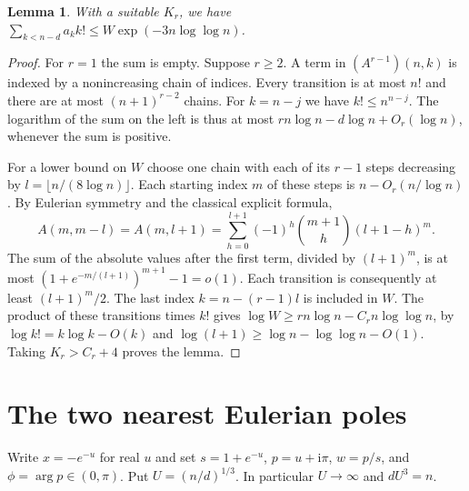 \documentclass[11pt]{article}
\newtheorem{lemma}[theorem]{Lemma}
\newcommand{\ii}{\mathrm{i}}
\begin{document}
\begin{lemma}\label{conc}
With a suitable $K_r$, we have $\sum_{k<n-d}a_k k!\le W\exp(-3n\log\log n)$.
\end{lemma}
\begin{proof}
For $r=1$ the sum is empty. Suppose $r\ge2$. A term in $(A^{r-1})(n,k)$ is indexed by a nonincreasing chain of indices. Every transition is at most $n!$ and there are at most $(n+1)^{r-2}$ chains. For $k=n-j$ we have $k!\le n^{n-j}$. The logarithm of the sum on the left is thus at most $rn\log n-d\log n+O_r(\log n)$, whenever the sum is positive.

For a lower bound on $W$ choose one chain with each of its $r-1$ steps decreasing by $l=\lfloor n/(8\log n)\rfloor$. Each starting index $m$ of these steps is $n-O_r(n/\log n)$. By Eulerian symmetry and the classical explicit formula,
\[
 A(m,m-l)=A(m,l+1)=\sum_{h=0}^{l+1}(-1)^h\binom{m+1}{h}(l+1-h)^m .
\]
The sum of the absolute values after the first term, divided by $(l+1)^m$, is at most $(1+e^{-m/(l+1)})^{m+1}-1=o(1)$. Each transition is consequently at least $(l+1)^m/2$. The last index $k=n-(r-1)l$ is included in $W$. The product of these transitions times $k!$ gives $\log W\ge rn\log n-C_r n\log\log n$, by $\log k!=k\log k-O(k)$ and $\log(l+1)\ge\log n-\log\log n-O(1)$. Taking $K_r>C_r+4$ proves the lemma.
\end{proof}

\section{The two nearest Eulerian poles}
Write $x=-e^{-u}$ for real $u$ and set $s=1+e^{-u}$, $p=u+\ii\pi$, $w=p/s$, and $\phi=\arg p\in(0,\pi)$. Put $U=(n/d)^{1/3}$. In particular $U\to\infty$ and $dU^3=n$.
\end{document}
